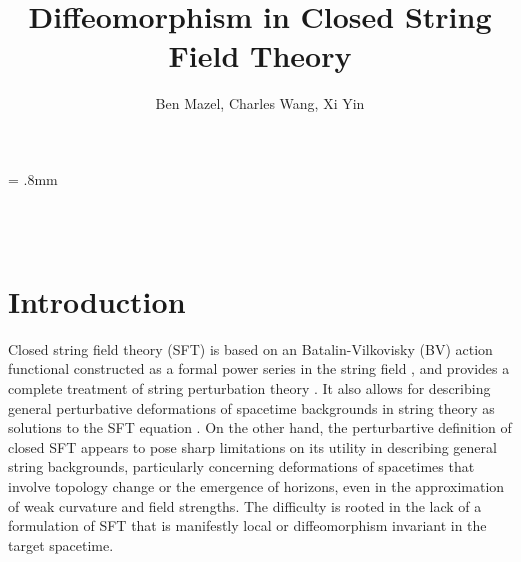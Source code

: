 \documentclass[12pt]{article}
\begin{document}
\unitlength = .8mm

\begin{titlepage}

\begin{center}

\hfill \\
\hfill \\
\vskip 1cm




\title{Diffeomorphism in Closed String Field Theory}

\author{Ben Mazel, Charles Wang, Xi Yin}

\address{Jefferson Physical Laboratory, Harvard University, 
Cambridge, MA 02138 USA
}


\end{center}



\vfill

\end{titlepage}

\eject

\begingroup
\hypersetup{linkcolor=black}

\tableofcontents

\endgroup




\section{Introduction}

Closed string field theory (SFT) is based on an Batalin-Vilkovisky (BV) action functional constructed as a formal power series in the string field \cite{Zwiebach:1992ie}, and provides a complete treatment of string perturbation theory \cite{Sen:2014pia,  Pius:2014gza, Pius:2014iaa, Sen:2019jpm}. It also allows for describing general perturbative deformations of spacetime backgrounds in string theory as solutions to the SFT equation \cite{Sen:1993kb, Sen:2014dqa, Cho:2018nfn, Mazel:2024alu}. On the other hand, the perturbartive definition of closed SFT appears to pose sharp limitations on its utility in describing general string backgrounds, particularly concerning deformations of spacetimes that involve topology change or the emergence of horizons, even in the approximation of weak curvature and field strengths. The difficulty is rooted in the lack of a formulation of SFT that is manifestly local or diffeomorphism invariant in the target spacetime.
\end{document}
